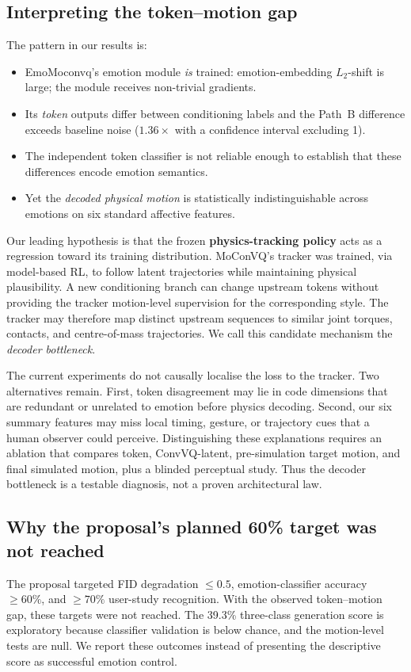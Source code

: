 \documentclass[conference]{IEEEtran}
\begin{document}
\subsection{Interpreting the token--motion gap}
The pattern in our results is:
\begin{itemize}
\item EmoMoconvq's emotion module \emph{is} trained: emotion-embedding
$L_2$-shift is large; the module receives non-trivial gradients.
\item Its \emph{token} outputs differ between conditioning labels and the
Path~B difference exceeds baseline noise ($1.36\!\times$ with a confidence
interval excluding 1).
\item The independent token classifier is not reliable enough to establish
that these differences encode emotion semantics.
\item Yet the \emph{decoded physical motion} is statistically
indistinguishable across emotions on six standard affective features.
\end{itemize}
Our leading hypothesis is that the frozen \textbf{physics-tracking policy}
acts as a regression toward its training distribution. MoConVQ's tracker was
trained, via model-based RL, to follow latent trajectories while maintaining
physical plausibility. A new conditioning branch can change upstream tokens
without providing the tracker motion-level supervision for the corresponding
style. The tracker may therefore map distinct upstream sequences to similar
joint torques, contacts, and centre-of-mass trajectories. We call this
candidate mechanism the \emph{decoder bottleneck}.

The current experiments do not causally localise the loss to the tracker.
Two alternatives remain. First, token disagreement may lie in code dimensions
that are redundant or unrelated to emotion before physics decoding. Second,
our six summary features may miss local timing, gesture, or trajectory cues
that a human observer could perceive. Distinguishing these explanations
requires an ablation that compares token, ConvVQ-latent, pre-simulation target
motion, and final simulated motion, plus a blinded perceptual study. Thus the
decoder bottleneck is a testable diagnosis, not a proven architectural law.

\subsection{Why the proposal's planned 60\% target was not reached}
The proposal targeted FID degradation $\le 0.5$, emotion-classifier
accuracy $\ge 60\%$, and $\ge 70\%$ user-study recognition. With the
observed token--motion gap, these targets were not reached. The 39.3\%
three-class generation score is exploratory because classifier validation is
below chance, and the motion-level tests are null. We report these outcomes
instead of presenting the descriptive score as successful emotion control.
\end{document}
